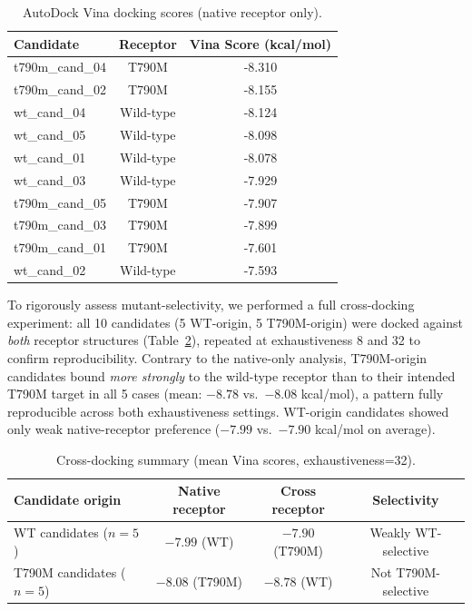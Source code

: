 \documentclass[11pt]{article}
\begin{document}
\begin{table}[h]
\centering
\caption{AutoDock Vina docking scores (native receptor only).}
\label{tab:docking}
\begin{tabular}{lcc}
\toprule
Candidate & Receptor & Vina Score (kcal/mol) \\
\midrule
t790m\_cand\_04 & T790M & -8.310 \\
t790m\_cand\_02 & T790M & -8.155 \\
wt\_cand\_04    & Wild-type & -8.124 \\
wt\_cand\_05    & Wild-type & -8.098 \\
wt\_cand\_01    & Wild-type & -8.078 \\
wt\_cand\_03    & Wild-type & -7.929 \\
t790m\_cand\_05 & T790M & -7.907 \\
t790m\_cand\_03 & T790M & -7.899 \\
t790m\_cand\_01 & T790M & -7.601 \\
wt\_cand\_02    & Wild-type & -7.593 \\
\bottomrule
\end{tabular}
\end{table}

To rigorously assess mutant-selectivity, we performed a full cross-docking
experiment: all 10 candidates (5 WT-origin, 5 T790M-origin) were docked
against \emph{both} receptor structures (Table~\ref{tab:crossdock}), repeated
at exhaustiveness 8 and 32 to confirm reproducibility.
Contrary to the native-only analysis, T790M-origin candidates bound
\emph{more strongly} to the wild-type receptor than to their intended T790M
target in all 5 cases (mean: $-8.78$ vs.\ $-8.08$ kcal/mol), a pattern fully
reproducible across both exhaustiveness settings.
WT-origin candidates showed only weak native-receptor preference
($-7.99$ vs.\ $-7.90$ kcal/mol on average).

\begin{table}[h]
\centering
\caption{Cross-docking summary (mean Vina scores, exhaustiveness=32).}
\label{tab:crossdock}
\begin{tabular}{lccc}
\toprule
Candidate origin & Native receptor & Cross receptor & Selectivity \\
\midrule
WT candidates ($n=5$)    & $-7.99$ (WT)    & $-7.90$ (T790M) & Weakly WT-selective \\
T790M candidates ($n=5$) & $-8.08$ (T790M) & $-8.78$ (WT)    & Not T790M-selective \\
\bottomrule
\end{tabular}
\end{table}
\end{document}
